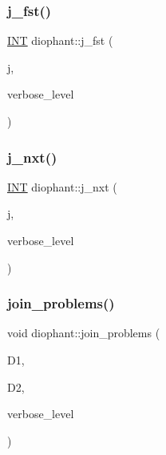 \mbox{\label{classdiophant_aba2e20ceb103c3f0e00667a699c25fb5}} 
\subsubsection{\texorpdfstring{j\+\_\+fst()}{j\_fst()}}
{\footnotesize\ttfamily \mbox{\hyperlink{galois_8h_a09fddde158a3a20bd2dcadb609de11dc}{I\+NT}} diophant\+::j\+\_\+fst (\begin{DoxyParamCaption}\item[{\mbox{\hyperlink{galois_8h_a09fddde158a3a20bd2dcadb609de11dc}{I\+NT}}}]{j,  }\item[{\mbox{\hyperlink{galois_8h_a09fddde158a3a20bd2dcadb609de11dc}{I\+NT}}}]{verbose\+\_\+level }\end{DoxyParamCaption})}

\mbox{\label{classdiophant_ab7edeaceecc124fb9595d34e2f10fd29}} 
\subsubsection{\texorpdfstring{j\+\_\+nxt()}{j\_nxt()}}
{\footnotesize\ttfamily \mbox{\hyperlink{galois_8h_a09fddde158a3a20bd2dcadb609de11dc}{I\+NT}} diophant\+::j\+\_\+nxt (\begin{DoxyParamCaption}\item[{\mbox{\hyperlink{galois_8h_a09fddde158a3a20bd2dcadb609de11dc}{I\+NT}}}]{j,  }\item[{\mbox{\hyperlink{galois_8h_a09fddde158a3a20bd2dcadb609de11dc}{I\+NT}}}]{verbose\+\_\+level }\end{DoxyParamCaption})}

\mbox{\label{classdiophant_a6753173ea1ad81280ce91efe6a089102}} 
\subsubsection{\texorpdfstring{join\+\_\+problems()}{join\_problems()}}
{\footnotesize\ttfamily void diophant\+::join\+\_\+problems (\begin{DoxyParamCaption}\item[{\mbox{\hyperlink{classdiophant}{diophant}} $\ast$}]{D1,  }\item[{\mbox{\hyperlink{classdiophant}{diophant}} $\ast$}]{D2,  }\item[{\mbox{\hyperlink{galois_8h_a09fddde158a3a20bd2dcadb609de11dc}{I\+NT}}}]{verbose\+\_\+level }\end{DoxyParamCaption})}

